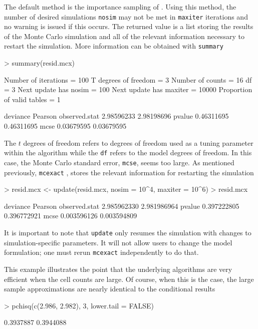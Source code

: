 \documentclass[a4paper]{article}
\newcommand{\mcexact}{\texttt{mcexact} }
\begin{document}
The default method is the importance sampling of
\cite{booth:butler:1999}. Using this method, the number of desired
simulations \texttt{nosim} may not be met in \texttt{maxiter}
iterations and no warning is issued if this occurs. The returned value
is a list storing the results of the Monte Carlo simulation and all of
the relevant information necessary to restart the simulation.  More
information can be obtained with \texttt{summary}
\begin{Schunk}
\begin{Sinput}
> summary(resid.mcx)
\end{Sinput}
\begin{Soutput}
Number of iterations       =  100 
T degrees of freedom       =  3 
Number of counts           =  16 
df                         =  3 
Next update has nosim      =  100 
Next update has maxiter    =  10000 
Proportion of valid tables =  1 

                deviance    Pearson
observed.stat 2.98596233 2.98198696
pvalue        0.46311695 0.46311695
mcse          0.03679595 0.03679595
\end{Soutput}
\end{Schunk}
The $t$ degrees of freedom refers to degrees of freedom used as a
tuning parameter within the algorithm while the \texttt{df} refers to
the model degrees of freedom. In this case, the Monte Carlo standard
error, \texttt{mcse}, seems too large. As mentioned previously,
\mcexact, stores the relevant information for restarting the
simulation
\begin{Schunk}
\begin{Sinput}
> resid.mcx <- update(resid.mcx, nosim = 10^4, maxiter = 10^6)
> resid.mcx
\end{Sinput}
\begin{Soutput}
                 deviance     Pearson
observed.stat 2.985962330 2.981986964
pvalue        0.397222805 0.396772921
mcse          0.003596126 0.003594809
\end{Soutput}
\end{Schunk}
It is important to note that \texttt{update} only resumes the
simulation with changes to simulation-specific parameters. It will not
allow users to change the model formulation; one must rerun \mcexact 
independently to do that.

This example illustrates the point that the underlying algorithms are
very efficient when the cell counts are large. Of course, when this is
the case, the large sample approximations are nearly identical to the
conditional results
\begin{Schunk}
\begin{Sinput}
> pchisq(c(2.986, 2.982), 3, lower.tail = FALSE)
\end{Sinput}
\begin{Soutput}
[1] 0.3937887 0.3944088
\end{Soutput}
\end{Schunk}
\end{document}
